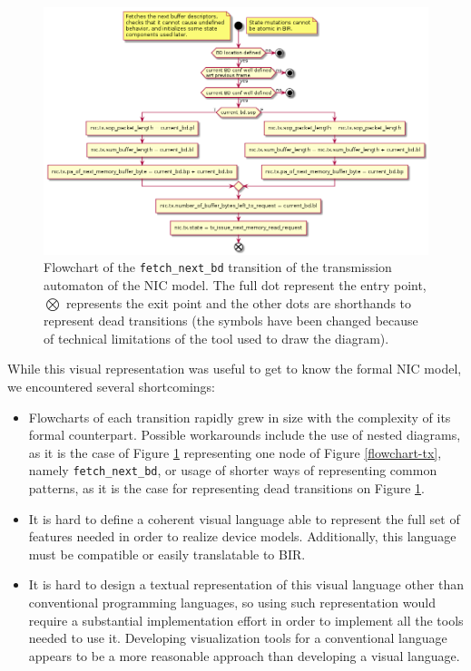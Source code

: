 \documentclass{kththesis}
\begin{document}
{\begin{figure}[h]
	\includegraphics[width=\textwidth]{figures/flowchart-tx_fetch_next_bd.png}
	\centering
	\caption{Flowchart of the \texttt{fetch\_next\_bd} transition of the transmission automaton of the NIC model. The full dot represent the entry point, $\bigotimes$ represents the exit point and the other dots are shorthands to represent dead transitions (the symbols have been changed because of technical limitations of the tool used to draw the diagram).}
	\label{flowchart-tx_fetch_next_bd}
\end{figure}

While this visual representation was useful to get to know the formal NIC model, we encountered several shortcomings:

\begin{itemize}
    \item Flowcharts of each transition rapidly grew in size with the complexity of its formal counterpart. Possible workarounds include the use of nested diagrams, as it is the case of Figure \ref{flowchart-tx_fetch_next_bd} representing one node of Figure \ref{flowchart-tx}, namely \texttt{fetch\_next\_bd}, or usage of shorter ways of representing common patterns, as it is the case for representing dead transitions on Figure \ref{flowchart-tx_fetch_next_bd}.
    \item It is hard to define a coherent visual language able to represent the full set of features needed in order to realize device models. Additionally, this language must be compatible or easily translatable to BIR.
    \item It is hard to design a textual representation of this visual language other than conventional programming languages, so using such representation would require a substantial implementation effort in order to implement all the tools needed to use it. Developing visualization tools for a conventional language appears to be a more reasonable approach than developing a visual language.
\end{itemize}

}
\end{document}
